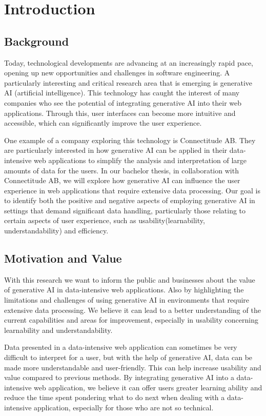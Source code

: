 \chapter{Introduction}
\label{chp:introduction}  %

\section{Background}
Today, technological developments are advancing at an increasingly rapid pace, opening up new opportunities and challenges in software engineering. A particularly interesting and critical research area that is emerging is generative AI (artificial intelligence). This technology has caught the interest of many companies who see the potential of integrating generative AI into their web applications. Through this, user interfaces can become more intuitive and accessible, which can significantly improve the user experience.

One example of a company exploring this technology is Connectitude AB. They are particularly interested in how generative AI can be applied in their data-intensive web applications to simplify the analysis and interpretation of large amounts of data for the users. In our bachelor thesis, in collaboration with Connectitude AB, we will explore how generative AI can influence the user experience in web applications that require extensive data processing. Our goal is to identify both the positive and negative aspects of employing generative AI in settings that demand significant data handling, particularly those relating to certain aspects of user experience, such as usability(learnability, understandability) and efficiency.

\section{Motivation and Value}
With this research we want to inform the public and businesses about the value of generative AI in data-intensive web applications. Also by highlighting the limitations and challenges of using generative AI in environments that require extensive data processing. We believe it can lead to a better understanding of the current capabilities and areas for improvement, especially in usability concerning learnability and understandability.

Data presented in a data-intensive web application can sometimes be very difficult to interpret for a user, but with the help of generative AI, data can be made more understandable and user-friendly. This can help increase usability and value compared to previous methods. By integrating generative AI into a data-intensive web application, we believe it can offer users greater learning ability and reduce the time spent pondering what to do next when dealing with a data-intensive application, especially for those who are not so technical.


